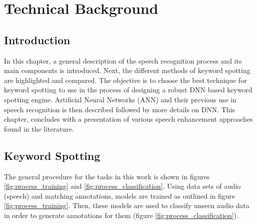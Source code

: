 \chapter{Technical Background} \label{chap:tech_background}

    \section{Introduction}\label{sec:background_introduction}
        In this chapter, a general description of the speech recognition process and its main components is introduced. 
        Next, the different methods of keyword spotting are highlighted and compared. 
        The objective is to choose the best technique for keyword spotting to use in the process of designing a robust DNN based keyword spotting engine. 
        Artificial Neural Networks (ANN) and their previous use in speech recognition is then described followed by more details on DNN. 
        This chapter, concludes with a presentation of various speech enhancement approaches found in the literature.
    
    \section{Keyword Spotting}\label{sec:kws}

        The general procedure for the tasks in this work is shown in figures \ref{fig:process_training} and \ref{fig:process_classification}. 
        Using data sets of audio (speech) and matching annotations, models are trained as outlined in figure \ref{fig:process_training}. 
        Then, these models are used to classify unseen audio data in order to generate annotations for them (figure \ref{fig:process_classification}).

